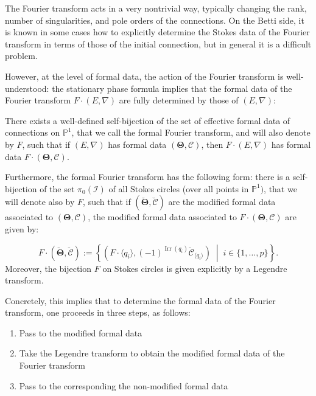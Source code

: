 \documentclass[11pt,a4paper]{amsart}
\numberwithin{equation}{section}
\DeclareMathOperator{\Irr}{Irr}
\newcommand{\cir}[1]{\langle #1 \rangle}
\begin{document}
The Fourier transform acts in a very nontrivial way, typically changing the rank, number of singularities, and pole orders of the connections. On the Betti side, it is known in some cases how to explicitly determine the Stokes data of the Fourier transform in terms of those of the initial connection, but in general it is a difficult problem.

However, at the level of formal data, the action of the Fourier transform is well-understood: the stationary phase formula \cite{malgrange1991equations,garcia2004microlocalization, fang2009calculation, sabbah2008explicit,graham2013calculation} implies that the formal data of the Fourier transform $F\cdot (E, \nabla)$ are fully determined by those of $(E, \nabla)$:

\begin{theorem}
There exists a well-defined self-bijection of the set of effective formal data of connections on $\mathbb P^1$, that we call the formal Fourier transform, and will also denote by $F$, such that if $(E,\nabla)$ has formal data $(\bm\Theta, \bm{\mathcal C})$, then $F\cdot (E,\nabla)$ has formal data $F\cdot (\bm\Theta, \bm{\mathcal C})$.
 
Furthermore, the formal Fourier transform has the following form: there is a self-bijection of the set $\pi_0(\mathcal I)$ of all Stokes circles (over all points in $\mathbb P^1)$, that we will denote also by $F$, such that if $(\bm{\breve\Theta}, \bm{\breve{\mathcal C}})$ are the modified formal data associated to $(\bm\Theta, \bm{\mathcal C})$, the modified formal data associated to $F\cdot(\bm\Theta, \bm{\mathcal C})$ are given by:


\begin{equation}
F\cdot (\bm{\breve\Theta}, \bm{\breve{\mathcal C}}):=\left\{ \left(F\cdot \cir{q_i}, (-1)^{\Irr(q_i)}\breve{\mathcal C}_{\cir{q_i}}\right) \;\middle \vert\; i\in \{1, \dots, p\} \right\} .
\end{equation} 
Moreover, the bijection $F$ on Stokes circles is given explicitly by a Legendre transform.
\end{theorem}


Concretely, this implies that to determine the formal data of the Fourier transform, one proceeds in three steps, as follows:
\begin{enumerate}
\item Pass to the modified formal data
\item Take the Legendre transform to obtain the modified formal data of the Fourier transform
\item Pass to the corresponding the non-modified formal data
\end{enumerate}
\end{document}
